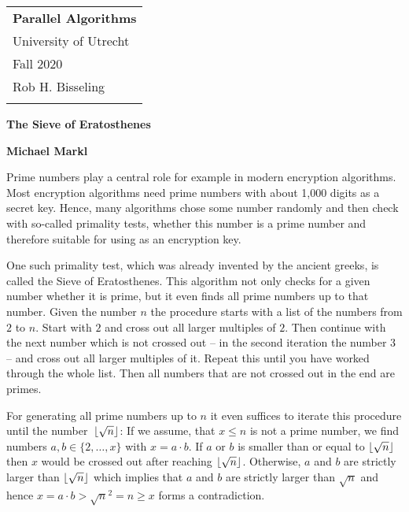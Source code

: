 \documentclass[a4paper,12pt]{article}
\DeclarePairedDelimiter\floor{\lfloor}{\rfloor}
\begin{document}
\thispagestyle{empty}

\begin{tabular}{p{15.5cm}} %
{\large \bf Parallel Algorithms} \\
University of Utrecht \\ Fall 2020  \\ Rob H. Bisseling\\
\hline
\\
\end{tabular}

\vspace*{0.3cm}
\begin{center}
	{\Large \bf The Sieve of Eratosthenes}
	\vspace{2mm}
	
	{\bf Michael Markl}
\end{center}  
\vspace{0.4cm}

Prime numbers play a central role for example in modern encryption algorithms.
Most encryption algorithms need prime numbers with about 1,000 digits as a secret key.
Hence, many algorithms chose some number randomly and then check with so-called primality tests, whether this number is a prime number and therefore suitable for using as an encryption key.

One such primality test, which was already invented by the ancient greeks, is called the Sieve of Eratosthenes.
This algorithm not only checks for a given number whether it is prime, but it even finds all prime numbers up to that number.
Given the number $n$ the procedure starts with a list of the numbers from $2$ to $n$.
Start with $2$ and cross out all larger multiples of $2$.
Then continue with the next number which is not crossed out  -- in the second iteration the number $3$ -- and cross out all larger multiples of it.
Repeat this until you have worked through the whole list.
	Then all numbers that are not crossed out in the end are primes.

For generating all prime numbers up to $n$ it even suffices to iterate this procedure until the number~$\floor{\sqrt{n}}$: If we assume, that $x\leq n$ is not a prime number, we find numbers $a,b\in\{2, \dots, x\}$ with $x=a\cdot b$.
If $a$ or $b$ is smaller than or equal to $\floor{\sqrt{n}}$ then $x$ would be crossed out after reaching $\floor{\sqrt{n}}$.
Otherwise, $a$ and $b$ are strictly larger than $\floor{\sqrt{n}}$ which implies that $a$ and $b$ are strictly larger than $\sqrt{n}$ and hence $x = a\cdot b > \sqrt{n}^2 = n \geq x$ forms a contradiction.
\end{document}
